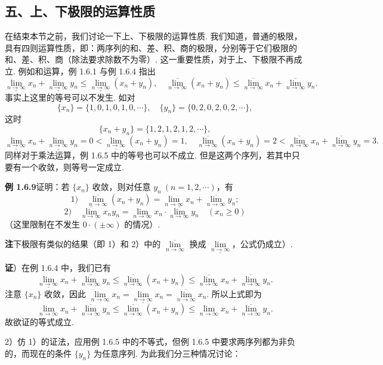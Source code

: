 \documentclass[UTF8, 12pt, fontset=fandol, oneside]{ctexart}
\begin{document}
\subsection*{五、上、下极限的运算性质}

在结束本节之前，我们讨论一下上、下极限的运算性质. 我们知道，普通的极限，具有四则运算性质，即：两序列的和、差、积、商的极限，分别等于它们极限的和、差、积、商（除法要求除数不为零）. 这一重要性质，对于上、下极限不再成立. 例如和运算，例 1.6.1 与例 1.6.4 指出
\[
  \underline{\lim_{n\to\infty}}x_n+\underline{\lim_{n\to\infty}}y_n
  \le \underline{\lim_{n\to\infty}}(x_n+y_n),\quad
  \overline{\lim_{n\to\infty}}(x_n+y_n)
  \le \overline{\lim_{n\to\infty}}x_n+\overline{\lim_{n\to\infty}}y_n.
\]
事实上这里的等号可以不发生. 如对
\[
  \{x_n\}=\{1,0,1,0,1,0,\cdots\},\quad
  \{y_n\}=\{0,2,0,2,0,2,\cdots\},
\]
这时
\[
  \{x_n+y_n\}=\{1,2,1,2,1,2,\cdots\},
\]
\[
  \underline{\lim_{n\to\infty}}x_n+\underline{\lim_{n\to\infty}}y_n
  =0<\underline{\lim_{n\to\infty}}(x_n+y_n)=1,\quad
  \overline{\lim_{n\to\infty}}(x_n+y_n)=2<\overline{\lim_{n\to\infty}}x_n+\overline{\lim_{n\to\infty}}y_n=3.
\]
同样对于乘法运算，例 1.6.5 中的等号也可以不成立. 但是这两个序列，若其中只要有一个收敛，则等号一定成立.

\noindent\textbf{例 1.6.9}\quad 证明：若 $\{x_n\}$ 收敛，则对任意 $y_n\ (n=1,2,\cdots)$，有
\[
  1)\quad \overline{\lim_{n\to\infty}}(x_n+y_n)=\lim_{n\to\infty}x_n+\overline{\lim_{n\to\infty}}y_n;
\]
\[
  2)\quad \overline{\lim_{n\to\infty}}x_ny_n
  =\lim_{n\to\infty}x_n\cdot\overline{\lim_{n\to\infty}}y_n\quad(x_n\ge0)
\]
（这里限制在不发生 $0\cdot(\pm\infty)$ 的情况）.

\noindent\textbf{注}\quad 下极限有类似的结果（即 1）和 2）中的 $\overline{\lim\limits_{n\to\infty}}$ 换成 $\underline{\lim\limits_{n\to\infty}}$，公式仍成立）.

\noindent\textbf{证}）在例 1.6.4 中，我们已有
\[
  \underline{\lim_{n\to\infty}}x_n+\overline{\lim_{n\to\infty}}y_n
  \le \overline{\lim_{n\to\infty}}(x_n+y_n)
  \le \overline{\lim_{n\to\infty}}x_n+\overline{\lim_{n\to\infty}}y_n.
\]
注意 $\{x_n\}$ 收敛，因此 $\lim\limits_{n\to\infty}x_n=\underline{\lim\limits_{n\to\infty}}x_n=\overline{\lim\limits_{n\to\infty}}x_n$. 所以上式即为
\[
  \lim_{n\to\infty}x_n+\overline{\lim_{n\to\infty}}y_n
  \le \overline{\lim_{n\to\infty}}(x_n+y_n)
  \le \lim_{n\to\infty}x_n+\overline{\lim_{n\to\infty}}y_n.
\]
故欲证的等式成立.

2）仿 1）的证法，应用例 1.6.5 中的不等式，但例 1.6.5 中要求两序列都为非负的，而现在的条件 $\{y_n\}$ 为任意序列. 为此我们分三种情况讨论：
\end{document}
